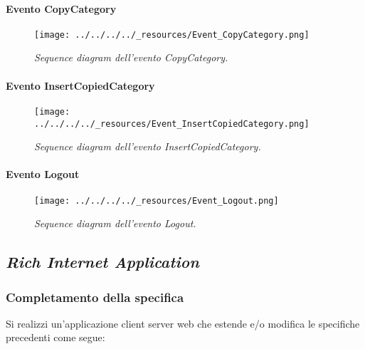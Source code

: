 \hypertarget{evento-copycategory}{%
\paragraph{Evento CopyCategory}\label{evento-copycategory}}

\begin{figure}
\centering
\texttt{[image: ../../../../\_resources/Event\_CopyCategory.png]}
\caption{\emph{Sequence diagram dell'evento CopyCategory.}}
\end{figure}

\hypertarget{evento-insertcopiedcategory}{%
\paragraph{Evento
InsertCopiedCategory}\label{evento-insertcopiedcategory}}

\begin{figure}
\centering
\texttt{[image: ../../../../\_resources/Event\_InsertCopiedCategory.png]}
\caption{\emph{Sequence diagram dell'evento InsertCopiedCategory.}}
\end{figure}

\hypertarget{evento-logout}{%
\paragraph{Evento Logout}\label{evento-logout}}

\begin{figure}
\centering
\texttt{[image: ../../../../\_resources/Event\_Logout.png]}
\caption{\emph{Sequence diagram dell'evento Logout.}}
\end{figure}

\hypertarget{rich-internet-application}{%
\subsection{\texorpdfstring{\emph{Rich Internet
Application}}{Rich Internet Application}}\label{rich-internet-application}}

\hypertarget{completamento-della-specifica}{%
\subsubsection{Completamento della
specifica}\label{completamento-della-specifica}}

Si realizzi un'applicazione client server web che estende e/o modifica
le specifiche precedenti come segue:

